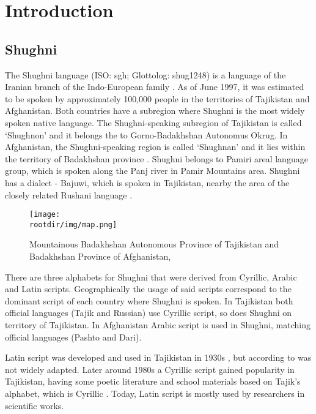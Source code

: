 \section{Introduction}

\subsection{Shughni}
The Shughni language (ISO: sgh; Glottolog: shug1248) is a language of the Iranian branch of the Indo-European family \parencite[12]{plungian_study_2022}. As of June 1997, it was estimated to be spoken by approximately 100,000 people \parencite[225]{edelman_languages_1999} in the territories of Tajikistan and Afghanistan. Both countries have a subregion where Shughni is the most widely spoken native language. The Shughni-speaking subregion of Tajikistan is called `Shughnon' and it belongs the to Gorno-Badakhshan Autonomus Okrug. In Afghanistan, the Shughni-speaking region is called `Shughnan' and it lies within the territory of Badakhshan province \parencite[2]{parker_shughni_2023}. Shughni belongs to Pamiri areal language group, which is spoken along the Panj river in Pamir Mountains area. Shughni has a dialect - Bajuwi, which is spoken in Tajikistan, nearby the area of the closely related Rushani language \parencite[5]{karamshoev_dialect_1963}.
\begin{figure}[h]
    \centering
    \texttt{[image: \\rootdir/img/map.png]}
    \caption{Mountainous Badakhshan Autonomous Province of Tajikistan and Badakhshan Province of Afghanistan, \parencite[Fig 1.1]{parker_shughni_2023}}
    \label{fig:map1}
\end{figure}

There are three alphabets for Shughni that were derived from Cyrillic, Arabic and Latin scripts. Geographically the usage of said scripts correspond to the dominant script of each country where Shughni is spoken. In Tajikistan both official languages (Tajik and Russian) use Cyrillic script, so does Shughni on territory of Tajikistan. In Afghanistan Arabic script is used in Shughni, matching official languages (Pashto and Dari). 

Latin script was developed and used in Tajikistan in 1930s \parencite[226]{edelman_languages_1999} \parencite[788]{edelman_dodykhudoeva_shughni_2009}, but according to \textcite{edelman_languages_1999} was not widely adapted. Later around 1980s a Cyrillic script gained popularity in Tajikistan, having some poetic literature and school materials based on Tajik's alphabet, which is Cyrillic \parencite{edelman_languages_1999}. Today, Latin script is mostly used by researchers in scientific works.

